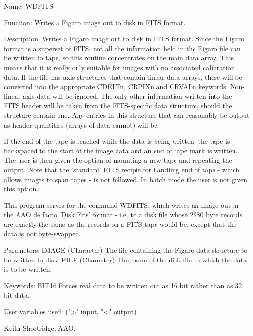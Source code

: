 \begin{description}
\begin{terminalv}
 Name:
    WDFITS

 Function:
    Writes a Figaro image out to disk in FITS format.

 Description:
    Writes a Figaro image out to disk in FITS format.  Since the
    Figaro format is a superset of FITS, not all the information
    held in the Figaro file can be written to tape, so this
    routine concentrates on the main data array.  This means that
    it is really only suitable for images with no associated
    calibration data.  If the file has axis structures that
    contain linear data arrays, these will be converted into the
    appropriate CDELTn, CRPIXn and CRVALn keywords.  Non-linear axis
    data will be ignored. The only other information written into
    the FITS header will be taken from the FITS-specific data
    structure, should the structure contain one.  Any entries in this
    structure that can reasonably be output as header quantities (arrays
    of data cannot) will be.

    If the end of the tape is reached while the data is being written,
    the tape is backspaced to the start of the image data and an
    end of tape mark is written.  The user is then given the option
    of mounting a new tape and repeating the output.  Note that the
    'standard' FITS recipie for handling end of tape - which allows
    images to span tapes - is not followed.  In batch mode the user
    is not given this option.

    This program serves for the command WDFITS, which writes
    an image out in the AAO de facto 'Disk Fits' format - i.e. to a
    disk file whose 2880 byte records are exactly the same as the
    records on a FITS tape would be, except that the data is not
    byte-swapped.

 Parameters:
    IMAGE     (Character) The file containing the Figaro data
              structure to be written to disk.
    FILE      (Character) The name of the
              disk file to which the data is to be written.

 Keywords:
    BIT16     Forces real data to be written out as 16 bit rather
              than as 32 bit data.

 User variables used:    (">" input, "<" output)

 Keith Shortridge, AAO.
\end{terminalv}
\end{description}
